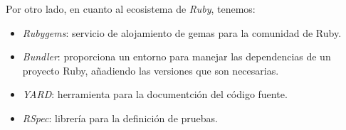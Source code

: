 Por otro lado, en cuanto al ecosistema de {\it Ruby}, tenemos:
\begin{itemize}
  \item {\it Rubygems}: servicio de alojamiento de gemas para la comunidad de Ruby.
  \item {\it Bundler}: proporciona un entorno para manejar las dependencias de un proyecto Ruby, añadiendo las versiones que son necesarias.
  \item {\it YARD}: herramienta para la documentción del código fuente.
  \item {\it RSpec}: librería para la definición de pruebas.
\end{itemize}
